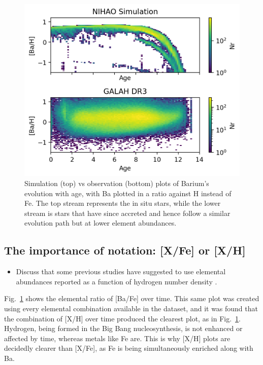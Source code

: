 \documentclass[fleqn,usenatbib]{mnras}
\begin{document}
\begin{figure}
	\includegraphics[width=\columnwidth]{figures/Ba_H_time.png}
    \caption{Simulation (top) vs observation (bottom) plots of Barium's evolution with age, with Ba plotted in a ratio against H instead of Fe. The top stream represents the in situ stars, while the lower stream is stars that have since accreted and hence follow a similar evolution path but at lower element abundances.}
    \label{fig:BaHtime}
\end{figure}

\subsection{The importance of notation: [X/Fe] or [X/H]}

\begin{itemize}
    \item Discuss that some previous studies have suggested to use elemental abundances reported as a function of hydrogen number density \citep[see e.g.][]{Fuhrmann2017b, Feuillet2021}.
\end{itemize}

Fig.~\ref{fig:BaHtime} shows the elemental ratio of [Ba/Fe] over time. This same plot was created using every elemental combination available in the dataset, and it was found that the combination of [X/H] over time produced the clearest plot, as in Fig.~\ref{fig:BaHtime}. Hydrogen, being formed in the Big Bang nucleosynthesis, is not enhanced or affected by time, whereas metals like Fe are. This is why [X/H] plots are decidedly clearer than [X/Fe], as Fe is being simultaneously enriched along with Ba.
\end{document}
